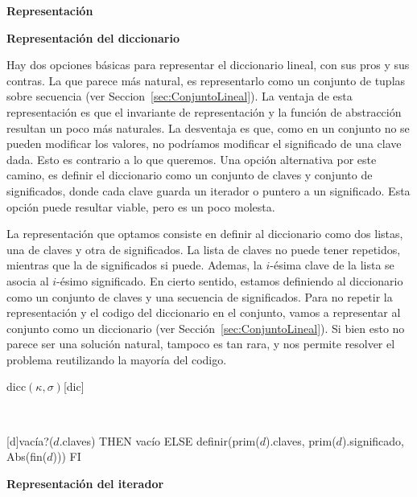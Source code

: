 \documentclass[a4paper,10pt]{article}
\newenvironment{Representacion}{%
  \vspace*{2ex}%
  \noindent\textbf{\Large Representación}%
  \vspace*{2ex}%
}{}
\newcommand{\Titulo}[1]{
  \vspace*{1ex}\par\noindent\textbf{\large #1}\par
}
\begin{document}
\begin{Representacion}
  
  \Titulo{Representación del diccionario}

  Hay dos opciones básicas para representar el diccionario lineal, con sus pros y sus contras.  La que parece más natural, es representarlo como un conjunto de tuplas sobre secuencia (ver Seccion~\ref{sec:ConjuntoLineal}).  La ventaja de esta representación es que el invariante de representación y la función de abstracción resultan un poco más naturales.  La desventaja es que, como en un conjunto no se pueden modificar los valores, no podríamos modificar el significado de una clave dada.  Esto es contrario a lo que queremos.  Una opción alternativa por este camino, es definir el diccionario como un conjunto de claves y conjunto de significados, donde cada clave guarda un iterador o puntero a un significado.  Esta opción puede resultar viable, pero es un poco molesta.

  La representación que optamos consiste en definir al diccionario como dos listas, una de claves y otra de significados.  La lista de claves no puede tener repetidos, mientras que la de significados si puede.  Ademas, la $i$-ésima clave de la lista se asocia al $i$-ésimo significado.  En cierto sentido, estamos definiendo al diccionario como un conjunto de claves y una secuencia de significados.  Para no repetir la representación y el codigo del diccionario en el conjunto, vamos a representar al conjunto como un diccionario (ver Sección~\ref{sec:ConjuntoLineal}).  Si bien esto no parece ser una solución natural, tampoco es tan rara, y nos permite resolver el problema reutilizando la mayoría del codigo.

  \begin{Estructura}{dicc$(\kappa,\sigma)$}[dic]
    \begin{Tupla}[dic]%
    \end{Tupla}
  \end{Estructura}


  ~

  [d]{\IF vacía?($d$.claves) THEN vacío ELSE definir(prim($d$).claves, prim($d$).significado, Abs(fin($d$))) FI}

  \Titulo{Representación del iterador}


\end{Representacion}
\end{document}
